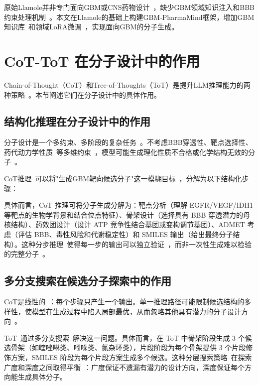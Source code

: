 原始Llamole并非专门面向GBM或CNS药物设计~\cite{liu2025multimodal}，缺少GBM领域知识注入和BBB约束处理机制~\cite{liu2025multimodal}。本文在Llamole的基础上构建GBM-PharmaMind框架，增加GBM知识库~\cite{Fu2025,Pardridge2012}和领域LoRA微调~\cite{hu2022lora}，实现面向GBM的分子生成。

\section{CoT-ToT 在分子设计中的作用}\label{sec:cot-tot-molecular-design}

Chain-of-Thought（CoT）和Tree-of-Thoughts（ToT）是提升LLM推理能力的两种策略~\cite{Wei2022,Yao2023}。本节阐述它们在分子设计中的具体作用。

\subsection{结构化推理在分子设计中的作用}

分子设计是一个多约束、多阶段的复杂任务~\cite{Zhou2019Exp}。不考虑BBB穿透性、靶点选择性、药代动力学性质~\cite{Pardridge2012}等多维约束~\cite{Zhou2019Exp}，模型可能生成理化性质不合格或化学结构无效的分子~\cite{Bagal2021}。

CoT推理~\cite{Wei2022}可以将"生成GBM靶向候选分子"这一模糊目标~\cite{Wei2022}，分解为以下结构化步骤：

具体而言，CoT 推理可将分子生成分解为：靶点分析（理解 EGFR/VEGF/IDH1 等靶点的生物学背景和结合位点特征）、骨架设计（选择具有 BBB 穿透潜力的母核结构）、药效团设计（设计 ATP 竞争性结合基团或变构调节基团）、ADMET 考虑（评估 BBB、毒性风险和代谢稳定性）和 SMILES 输出（给出最终分子结构）。这种分步推理~\cite{Wei2022}使得每一步的输出可以独立验证~\cite{Wei2022}，而非一次性生成难以检验的完整分子~\cite{Wei2022}。

\subsection{多分支搜索在候选分子探索中的作用}

CoT是线性的~\cite{Yao2023}：每个步骤只产生一个输出。单一推理路径可能限制候选结构的多样性，使模型在生成过程中陷入局部最优，从而忽略其他具有潜力的分子设计方向~\cite{Yao2023}。

ToT~\cite{Yao2023}通过多分支搜索~\cite{Yao2023}解决这一问题。具体而言，在 ToT 中骨架阶段生成 3 个候选骨架（如喹唑啉类、吲哚类、氮杂环类），片段阶段为每个骨架提供 3 个片段修饰方案，SMILES 阶段为每个片段方案生成多个候选。这种分层搜索策略~\cite{Yao2023}在探索广度和深度之间取得平衡~\cite{Yao2023}：广度保证不遗漏有潜力的设计方向，深度保证每个方向能生成具体分子。

